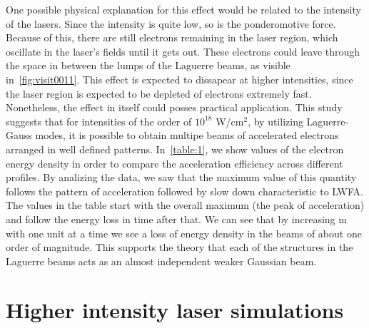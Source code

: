 \documentclass[12pt, class=report, crop=false]{standalone}
\begin{document}
One possible physical explanation for this effect would be related to the intensity of the lasers. Since the intensity is quite low, so is the ponderomotive force. Because of this, there are still electrons remaining in the laser region, which oscillate in the laser's fields until it gets out. These electrons could leave through the space in between the lumps of the Laguerre beams, as visible in~\cref{fig:visit0011}. This effect is expected to dissapear at higher intensities, since the laser region is expected to be depleted of electrons extremely fast. Nonetheless, the effect in itself could posses practical application. This study suggests that for intensities of the order of $10^18$ W/cm$^2$, by utilizing Laguerre-Gauss modes, it is possible to obtain multipe beams of accelerated electrons arranged in well defined patterns. In~\cref{table:1}, we show values of the electron energy density in order to compare the acceleration efficiency across different profiles. By analizing the data, we saw that the maximum value of this quantity follows the pattern of acceleration followed by slow down characteristic to LWFA. The values in the table start with the overall maximum (the peak of acceleration) and follow the energy loss in time after that. We can see that by increasing m with one unit at a time we see a loss of energy density in the beams of about one order of magnitude. This supports the theory that each of the structures in the Laguerre beams acts as an almost independent weaker Gaussian beam.

\section{Higher intensity laser simulations}
\end{document}
